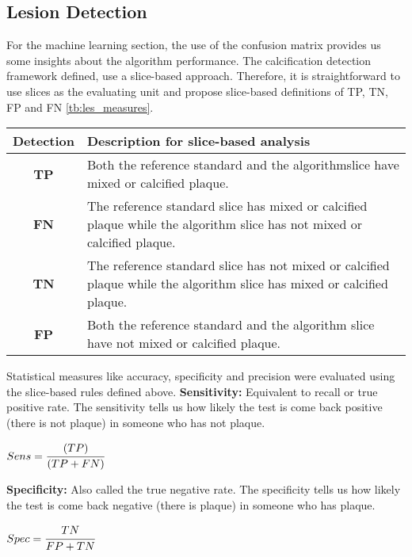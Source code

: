 \subsection{Lesion Detection}

For the machine learning section, the use of the confusion matrix provides us some insights about the algorithm performance. The calcification detection framework defined, use a slice-based  approach. Therefore, it is straightforward to use slices as the evaluating unit and propose slice-based definitions of TP, TN, FP and FN \ref{tb:les_measures}. 

\begin{table*}
\scriptsize
\caption{Stenosis detection, as compared to CTA and CCA reference standard. Descriptions of true-positive (TP), false-negative (FP), false-positive (FP) and true-negative (TN) detection.}
\centering
\begin{tabular}{|c|p{9cm}|}
\hline
\multicolumn{1}{|c|}{\textbf{Detection}} &\multicolumn{1}{p{9cm}|}{\textbf{Description} for slice-based analysis}\\
\hline
\textbf{TP}&Both the reference standard and the algorithmslice have mixed or calcified plaque.\\
\textbf{FN}&The reference standard slice has mixed or calcified plaque while the algorithm slice has not mixed or calcified plaque.\\
\textbf{TN}&The reference standard slice has not mixed or calcified plaque while the algorithm slice has mixed or calcified plaque.\\
\textbf{FP}&Both the reference standard and the algorithm slice have not mixed or calcified plaque.\\
\hline
\end{tabular}
\vspace{-0.3cm}
\label{tb:les_measures}
\normalsize
\end{table*}

Statistical measures \citep{Fawcett2004} like accuracy, specificity and precision were evaluated using the slice-based rules defined above.
\textbf{Sensitivity:} Equivalent to recall or true positive rate. The sensitivity tells us how likely the test is come back positive (there is not plaque) in someone who has not plaque.
\begin{center}
$Sens =  \cfrac{(TP)}{( TP + FN )} $
\end{center}

\textbf{Specificity:} Also called the true negative rate. The specificity tells us how likely the test is come back negative (there is plaque) in someone who has plaque.
\begin{center}
$Spec = \cfrac{TN}{FP+TN}$
\end{center}

